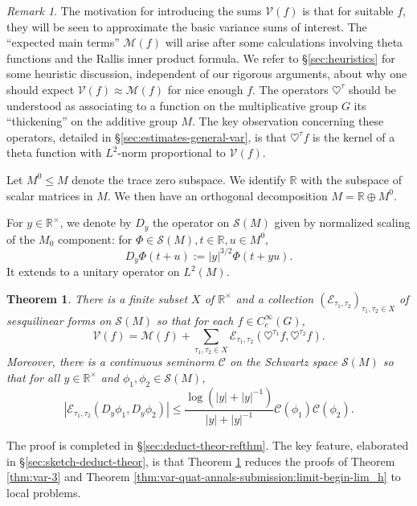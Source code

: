 \documentclass[reqno,10pt]{amsart}
\theoremstyle{plain} %
\newtheorem{theorem}             {Theorem}
\theoremstyle{definition}
\theoremstyle{plain} %
\theoremstyle{remark}
\newtheorem*{remark*}            {Remark}
\theoremstyle{itplain} %
\theoremstyle{remark} %
\renewcommand{\leq}{\leqslant}
\numberwithin{equation}{section}
\begin{document}
\begin{remark*}
  The motivation for introducing the sums $\mathcal{V}(f)$ is that for suitable $f$, they will be seen to approximate the basic variance sums of interest.  The ``expected main terms'' $\mathcal{M}(f)$ will arise after some calculations involving theta functions and the Rallis inner product formula.  We refer to \S\ref{sec:heuristics} for some heuristic discussion, independent of our rigorous arguments, about why one should expect $\mathcal{V}(f) \approx \mathcal{M}(f)$ for nice enough $f$.  The operators $\heartsuit^{\tau}$ should be understood as associating to a function on the multiplicative group $G$ its ``thickening'' on the additive group $M$.  The key observation concerning these operators, detailed in \S\ref{sec:estimates-general-var}, is that $\heartsuit^{\tau} f$ is the kernel of a theta function with $L^2$-norm proportional to $\mathcal{V}(f)$.
\end{remark*}


Let $M^0 \leq M$ denote the trace zero subspace.  We identify $\mathbb{R}$ with the subspace of scalar matrices in $M$.  We then have an orthogonal decomposition $M = \mathbb{R} \oplus M^0$.

For $y \in \mathbb{R}^\times$, we denote by $D_y$ the operator on $\mathcal{S}(M)$ given by normalized scaling of the $M_0$ component: for $\Phi \in \mathcal{S}(M), t \in \mathbb{R}, u \in M^0$,
\[
  D_y \Phi(t+u) := |y|^{3/2} \Phi(t + y u).
\]
It extends to a unitary operator on $L^2(M)$.

\begin{theorem}\label{thm:var-2}
  There is a finite subset $X$ of $\mathbb{R}^\times$ and a collection $(\mathcal{E}_{\tau_1, \tau_2})_{\tau_1, \tau_2 \in X}$ of sesquilinear forms on $\mathcal{S}(M)$ so that for each $f \in C_c^\infty(G)$,
  \begin{equation}\label{eq:var-2-main-identity}
    \mathcal{V}(f) = \mathcal{M}(f) + \sum_{\tau_1,\tau_2 \in X}
    \mathcal{E}_{\tau_1, \tau_2}(\heartsuit^{\tau_1} f,
    \heartsuit^{\tau_2} f).
  \end{equation}
  Moreover, there is a continuous seminorm $\mathcal{C}$ on the Schwartz space $\mathcal{S}(M)$ so that for all $y \in \mathbb{R}^\times$ and $\phi_1, \phi_2 \in \mathcal{S}(M)$,
  \begin{equation}\label{eqn:main-estimate}
    |\mathcal{E}_{\tau_1,\tau_2}(D_y \phi_1,
    D_y\phi_2)|
    \leq
    \frac{\log(|y| + |y|^{-1})}{|y| + |y|^{-1}}
    \mathcal{C}(\phi_1)
    \mathcal{C}(\phi_2).
  \end{equation}
\end{theorem}
The proof is completed in \S\ref{sec:deduct-theor-refthm}.  The key feature, elaborated in \S\ref{sec:sketch-deduct-theor}, is that Theorem \ref{thm:var-2} reduces the proofs of Theorem \ref{thm:var-3} and Theorem \ref{thm:var-quat-annals-submission:limit-begin-lim_h} to local problems. 
\end{document}
